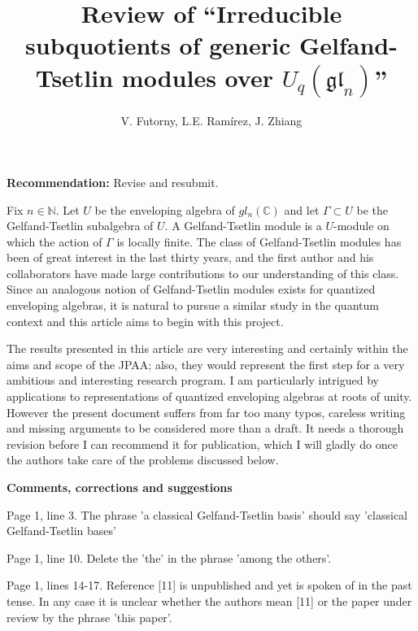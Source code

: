 \documentclass[11pt,fleqn]{article}
\title{Review of 
``Irreducible subquotients of generic Gelfand-Tsetlin modules over 
$U_q(\mathfrak{gl}_n)$''}
\author{V. Futorny, L.E. Ramírez, J. Zhiang}
\date{}
\newcommand\CC{\mathbb C}
\newcommand\NN{\mathbb N}
\begin{document}
\maketitle

\noindent\textbf{Recommendation:} Revise and resubmit.

Fix $n \in \NN$. Let $U$ be the enveloping algebra of $gl_n(\CC)$ and let 
$\Gamma \subset U$ be the Gelfand-Tsetlin subalgebra of $U$. A Gelfand-Tsetlin
module is a $U$-module on which the action of $\Gamma$ is locally finite. The 
class of Gelfand-Tsetlin modules has been of great interest in the last thirty 
years, and the first author and his collaborators have made large 
contributions to our understanding of this class. Since an analogous notion 
of Gelfand-Tsetlin modules exists for quantized enveloping algebras, it is 
natural to pursue a similar study in the quantum context and this article
aims to begin with this project. 

The results presented in this article are very interesting and certainly 
within the aims and scope of the JPAA; also, they would represent the first 
step for a very ambitious and interesting research program. I am 
particularly intrigued by applications to representations of quantized 
enveloping algebras at roots of unity. However the present document suffers 
from far too many typos, careless writing and missing arguments to be 
considered more than a draft. It needs a thorough revision before I can 
recommend it for publication, which I will gladly do once the authors take 
care of the problems discussed below.


\bigskip

\noindent\textbf{Comments, corrections and suggestions}

Page 1, line 3. The phrase 'a classical Gelfand-Tsetlin basis' should say
'classical Gelfand-Tsetlin bases'

Page 1, line 10. Delete the 'the' in the phrase 'among the others'.

Page 1, lines 14-17. Reference [11] is unpublished and yet is spoken of in the 
past tense. In any case it is unclear whether the authors mean [11] or the 
paper under review by the phrase 'this paper'.
\end{document}
